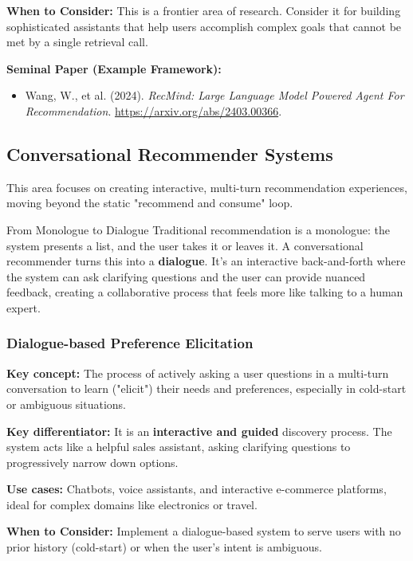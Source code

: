 \documentclass{article}
\begin{document}
\noindent\textbf{When to Consider:} This is a frontier area of research. Consider it for building sophisticated assistants that help users accomplish complex goals that cannot be met by a single retrieval call.

\noindent\textbf{Seminal Paper (Example Framework):}
    \begin{itemize}
        \item Wang, W., et al. (2024). \textit{RecMind: Large Language Model Powered Agent For Recommendation}. \url{https://arxiv.org/abs/2403.00366}.
    \end{itemize}
    
    \subsection{Conversational Recommender Systems}
    This area focuses on creating interactive, multi-turn recommendation experiences, moving beyond the static "recommend and consume" loop.
    
    \begin{asidebox}{From Monologue to Dialogue}
    Traditional recommendation is a monologue: the system presents a list, and the user takes it or leaves it. A conversational recommender turns this into a \textbf{dialogue}. It's an interactive back-and-forth where the system can ask clarifying questions and the user can provide nuanced feedback, creating a collaborative process that feels more like talking to a human expert.
    \end{asidebox}

    \subsubsection{Dialogue-based Preference Elicitation}
\noindent\textbf{Key concept:} The process of actively asking a user questions in a multi-turn conversation to learn ("elicit") their needs and preferences, especially in cold-start or ambiguous situations.

\noindent\textbf{Key differentiator:} It is an \textbf{interactive and guided} discovery process. The system acts like a helpful sales assistant, asking clarifying questions to progressively narrow down options.

\noindent\textbf{Use cases:} Chatbots, voice assistants, and interactive e-commerce platforms, ideal for complex domains like electronics or travel.

\noindent\textbf{When to Consider:} Implement a dialogue-based system to serve users with no prior history (cold-start) or when the user's intent is ambiguous.
\end{document}
